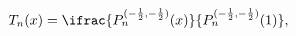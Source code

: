 \[\mathop{T_{n}\/}\nolimits\!\left(x\right)=\ifrac{\mathop{P^{(-\frac{1}{2},-%
\frac{1}{2})}_{n}\/}\nolimits\!\left(x\right)}{\mathop{P^{(-\frac{1}{2},-\frac%
{1}{2})}_{n}\/}\nolimits\!\left(1\right)},\]